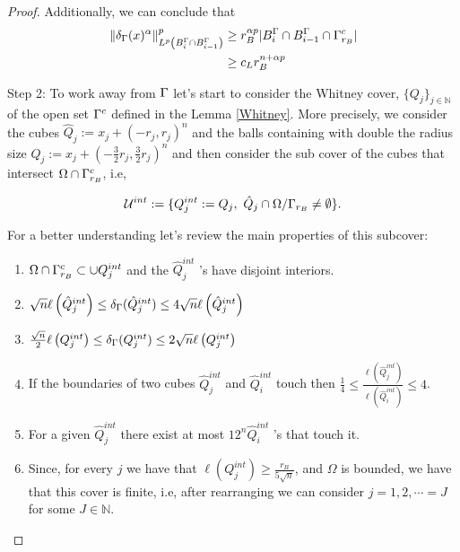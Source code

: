 \begin{proof}
Additionally, we can conclude that
\begin{align*}
   \|\delta_\Gamma(x)^\alpha\|^p_{L^p \left(B^\Gamma_{i}\cap B^\Gamma_{i-1}\right)}&\geq r_B^{\alpha p} |B^\Gamma_i\cap B^\Gamma_{i-1}\cap \Gamma^c_{r_B}|\\
   &\geq c_L r_B^{n+\alpha p} 
\end{align*}


Step 2: To work away from $\Gamma$ let's  start to consider the Whitney cover, $\{Q_j\}_{j\in \mathbb{N}}$ of the open set $\Gamma^c$ defined in the Lemma \ref{Whitney}. More precisely, we consider the  cubes $\hat{Q}_j := x_j + (-r_j,r_j)^n$ and the balls containing with double the radius size $Q_j := x_j + (-\frac{3}{2}r_j,\frac{3}{2}r_j)^n $ and then consider the sub cover  of the cubes that intersect $\Omega\cap\Gamma^c_{r_B}$, i.e,

$$\mathcal{U}^{int}:= \{Q_j^{int}:=Q_j,\ \hat{Q}_j\cap\Omega/\GG_{r_B}\neq \emptyset \}.$$
  
For a better understanding let's review the main properties of this subcover:
\begin{enumerate}
    \item $\Omega\cap\Gamma^c_{r_B}\subset\cup Q^{int}_{j}$ and the $\hat{Q}^{int}_{j}$ 's have disjoint interiors.
    \item $\sqrt{n} \ell\left(\hat{Q}^{int}_{j}\right) \leq \delta_\Gamma(\hat{Q}^{int}_{j}) \leq 4 \sqrt{n} \ell\left(\hat{Q}^{int}_{j}\right)$ 
    \item $\frac{\sqrt{n}}{2} \ell\left(Q^{int}_{j}\right) \leq \delta_\Gamma(Q^{int}_{j}) \leq 2 \sqrt{n} \ell\left(Q^{int}_{j}\right)$ 
\item If the boundaries of two cubes $\hat{Q}^{int}_{j}$ and $\hat{Q}^{int}_{i}$ touch then $\frac{1}{4} \leq \frac{\ell\left(\hat{Q}^{int}_{j}\right)}{\ell\left(\hat{Q}^{int}_{i}\right)} \leq 4$.
\item For a given $\hat{Q}^{int}_{j}$ there exist at most $12^n \hat{Q}^{int}_i$ 's that touch it.
\item Since, for every $j$ we have that $\ell(Q^{int}_{j})\geq\frac{r_B}{5\sqrt{n}}$, and $\Omega$ is bounded, we have that this cover is finite, i.e, after rearranging we can consider  $j=1,2,\cdots =J$ for some $J\in \mathbb{N}$.
\end{enumerate}



\end{proof}
